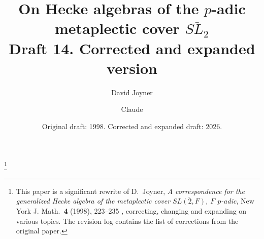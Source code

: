 \documentclass[12pt,letterpaper]{amsart}
\numberwithin{equation}{section}
\theoremstyle{definition}
\theoremstyle{remark}
\DeclareRobustCommand{\lowp}{\ensuremath{p}}
\begin{document}
\title[On Hecke algebras of \texorpdfstring{$\overline{SL_2}$}{SL2bar}]{On
Hecke algebras of the \texorpdfstring{\lowp}{p}-adic metaplectic cover
\texorpdfstring{$\overline{SL_2}$}{SL2bar}\\[6pt]
{\normalsize Draft 14. Corrected and expanded version}}

\author{David Joyner}
\thanks{This paper is a significant rewrite of D.~Joyner, \emph{A
correspondence for the generalized Hecke algebra of the metaplectic
cover $\overline{SL(2,F)}$, $F$ $p$-adic}, New York J. Math.\
\textbf{4} (1998), 223--235 \cite{Jo98}, correcting, changing and
expanding on various topics. The revision log contains the list of
corrections from the original paper.}

\author{Claude}
\address{Anthropic, San Francisco, California, USA}

\date{Original draft: 1998. Corrected and expanded draft: 2026.}

\end{document}
